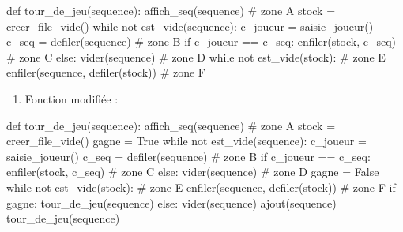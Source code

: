\documentclass[
  letterpaper,
  DIV=11,
  numbers=noendperiod]{scrartcl}
\newenvironment{Shaded}{\begin{snugshade}}{\end{snugshade}}
\newcommand{\CommentTok}[1]{\textcolor[rgb]{0.37,0.37,0.37}{#1}}
\newcommand{\ControlFlowTok}[1]{\textcolor[rgb]{0.00,0.23,0.31}{#1}}
\newcommand{\KeywordTok}[1]{\textcolor[rgb]{0.00,0.23,0.31}{#1}}
\newcommand{\NormalTok}[1]{\textcolor[rgb]{0.00,0.23,0.31}{#1}}
\newcommand{\OperatorTok}[1]{\textcolor[rgb]{0.37,0.37,0.37}{#1}}
\newcommand{\VariableTok}[1]{\textcolor[rgb]{0.07,0.07,0.07}{#1}}
\providecommand{\tightlist}{%
  \setlength{\itemsep}{0pt}\setlength{\parskip}{0pt}}\usepackage{longtable,booktabs,array}
\begin{document}
\begin{enumerate}
\begin{Shaded}
\begin{Highlighting}[]
\KeywordTok{def}\NormalTok{ tour\_de\_jeu(sequence):}
\NormalTok{    affich\_seq(sequence) }\CommentTok{\# zone A}
\NormalTok{    stock }\OperatorTok{=}\NormalTok{ creer\_file\_vide()}
    \ControlFlowTok{while} \KeywordTok{not}\NormalTok{ est\_vide(sequence):}
\NormalTok{        c\_joueur }\OperatorTok{=}\NormalTok{ saisie\_joueur()}
\NormalTok{        c\_seq }\OperatorTok{=}\NormalTok{ defiler(sequence) }\CommentTok{\# zone B}
        \ControlFlowTok{if}\NormalTok{ c\_joueur }\OperatorTok{==}\NormalTok{ c\_seq:}
\NormalTok{            enfiler(stock, c\_seq) }\CommentTok{\# zone C}
        \ControlFlowTok{else}\NormalTok{:}
\NormalTok{            vider(sequence) }\CommentTok{\# zone D}
    \ControlFlowTok{while} \KeywordTok{not}\NormalTok{ est\_vide(stock): }\CommentTok{\# zone E}
\NormalTok{        enfiler(sequence, defiler(stock)) }\CommentTok{\# zone F}
\end{Highlighting}
\end{Shaded}

  \begin{enumerate}
  \def\labelenumii{\alph{enumii}.}
  \setcounter{enumii}{1}
  \tightlist
  \item
    Fonction modifiée :
  \end{enumerate}
\end{enumerate}

\begin{Shaded}
\begin{Highlighting}[]
\KeywordTok{def}\NormalTok{ tour\_de\_jeu(sequence):}
\NormalTok{    affich\_seq(sequence) }\CommentTok{\# zone A}
\NormalTok{    stock }\OperatorTok{=}\NormalTok{ creer\_file\_vide()}
\NormalTok{    gagne }\OperatorTok{=} \VariableTok{True}
    \ControlFlowTok{while} \KeywordTok{not}\NormalTok{ est\_vide(sequence):}
\NormalTok{        c\_joueur }\OperatorTok{=}\NormalTok{ saisie\_joueur()}
\NormalTok{        c\_seq }\OperatorTok{=}\NormalTok{ defiler(sequence) }\CommentTok{\# zone B}
        \ControlFlowTok{if}\NormalTok{ c\_joueur }\OperatorTok{==}\NormalTok{ c\_seq:}
\NormalTok{            enfiler(stock, c\_seq) }\CommentTok{\# zone C}
        \ControlFlowTok{else}\NormalTok{:}
\NormalTok{            vider(sequence) }\CommentTok{\# zone D}
\NormalTok{            gagne }\OperatorTok{=} \VariableTok{False}
    \ControlFlowTok{while} \KeywordTok{not}\NormalTok{ est\_vide(stock): }\CommentTok{\# zone E}
\NormalTok{        enfiler(sequence, defiler(stock)) }\CommentTok{\# zone F}
    \ControlFlowTok{if}\NormalTok{ gagne:}
\NormalTok{        tour\_de\_jeu(sequence)}
    \ControlFlowTok{else}\NormalTok{:}
\NormalTok{        vider(sequence)}
\NormalTok{        ajout(sequence)}
\NormalTok{        tour\_de\_jeu(sequence)}
\end{Highlighting}
\end{Shaded}
\end{document}
